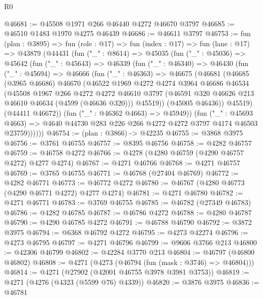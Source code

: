 \begin{lexlean}{R0}
\begin{coremodule}
@46681 := @45508 @1971 @266 @46440 @4272 @46670 @3797
@46685 := @46510 @1483 @1970 @4275 @46439
@46686 := @46611 @3797
@46753 := fun (plan : @3895) =>
  fun (role : @17) =>
  fun (index : @17) =>
  fun (lane : @17) =>
  @43879
    (@44431
      (fun ("_" : @8614) =>
      @45035
        (fun ("_" : @45036) =>
        @45642
          (fun ("_" : @45643) =>
          @46339
            (fun ("_" : @46340) =>
            @46430
              (fun ("_" : @45694) =>
              @46666
                (fun ("_" : @46363) =>
                @46675
                  (@46681
                    (@46685
                      (@3965 @46686)
                      @46670
                      (@46522
                        @1969
                        @4272
                        @4274
                        @3964
                        @46686
                        @46534
                        (@45508
                          @1967
                          @266
                          @4272
                          @4272
                          @46610
                          @3797
                          (@46591 @320 @46626 @213 @46610 @46634 (@4599 (@46636 @320)))
                          @45519))
                      (@45005 @46436))
                    @45519)
                  (@44411 @46672))
                (fun ("_" : @46362 @4663) => @45949))
              (fun ("_" : @45693 @4663) =>
              @4640 @44730 @283 @226 @266 @4272 @4272 @3797 @4174 @46503 @23759))))))
@46754 := (plan : @3866) -> @42235
@46755 := @3868 @3975
@46756 := @3761 @46755
@46757 := @8395 @46756
@46758 := @4282 @46757
@46759 := @46758 @4272
@46766 := @4278 (@4280 @46759 (@4290 @46757 @4272) @4277 @4274)
@46767 := @4271 @46766
@46768 := @4271 @46757
@46769 := @3765 @46755
@46771 := @46768 (@27404 @46769)
@46772 := @4282 @46771
@46773 := @46772 @4272
@46780 := @46767 (@4280 @46773 (@4290 @46771 @4272) @4277 @4274)
@46781 := @4271 @46780
@46782 := @4271 @46771
@46783 := @3769 @46755
@46785 := @46782 (@27349 @46783)
@46786 := @4282 @46785
@46787 := @46786 @4272
@46788 := @4280 @46787
@46790 := @4290 @46785 @4272
@46791 := @46788 @46790
@46792 := @3872 @3975
@46794 := @6368 @46792 @4272
@46795 := @4273 @42274
@46796 := @4273 @46795
@46797 := @4271 @46796
@46799 := @9606 @3766 @213
@46800 := @42306 @46799
@46802 := @42284 @3770 @213
@46804 := @46797 (@46800 @46802)
@46808 := @4271 (@4273 (@46794 (fun (mask : @3746) => @46804)))
@46814 := @4271 (@27902 (@42001 @46755 @3978 @3981 @3753))
@46819 := @4271 (@4276 (@4323 (@5599 @76) @4339))
@46820 := @3876 @3975
@46836 := @46781

\end{coremodule}
\end{lexlean}
